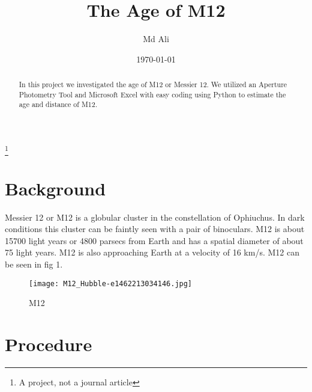 \documentclass[%
 reprint,
 amsmath,amssymb,
 aps,
]{revtex4-1}
\begin{document}

\title{The Age of M12}%
\thanks{A project, not a journal article}%

\author{Md Ali}
%


\date{\today}%

\begin{abstract}
In this project we investigated the age of M12 or Messier 12. We utilized an Aperture Photometry Tool and Microsoft Excel with easy coding using Python to estimate the age and distance of M12.
\end{abstract}

\maketitle


\section{\label{sec:level1}Background}

Messier 12 or M12 is a globular cluster in the constellation of Ophiuchus. In dark conditions this cluster can be faintly seen with a pair of binoculars. M12 is about 15700 light years or 4800 parsecs from Earth and has a spatial diameter of about 75 light years. M12 is also approaching Earth at a velocity of 16 km/s. M12 can be seen in fig 1.


\begin{figure}[htbp] %
   \centering
   \texttt{[image: M12\_Hubble-e1462213034146.jpg]} 
   \caption{M12}
   \label{fig:example}
\end{figure}

\section{\label{sec:level2}Procedure}
\end{document}
